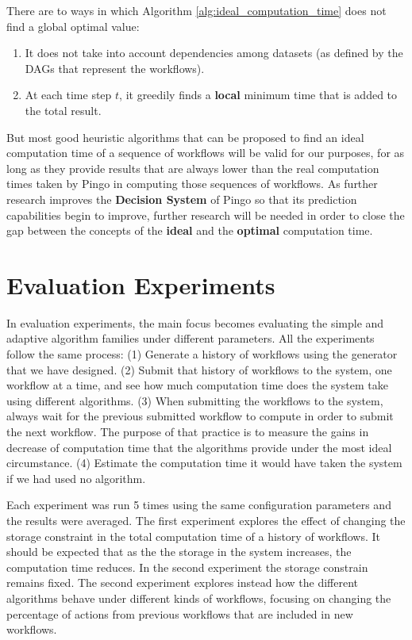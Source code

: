 There are to ways in which Algorithm \ref{alg:ideal_computation_time} does not find a global optimal value:
\begin{enumerate}
\item It does not take into account dependencies among datasets (as defined by the DAGs that represent the workflows).
\item At each time step $t$, it greedily finds a \textbf{local} minimum time that is added to the total result.
\end{enumerate}

But most good heuristic algorithms that can be proposed to find an ideal computation time of a sequence of workflows will be valid for our purposes, for as long as they provide results that are always lower than the real computation times taken by Pingo in computing those sequences of workflows.  As further research improves the \textbf{Decision System} of Pingo so that its prediction capabilities begin to improve, further research will be needed in order to close the gap between the concepts of the \textbf{ideal} and the \textbf{optimal} computation time.

\section{Evaluation Experiments}
In evaluation experiments, the main focus becomes evaluating the simple and adaptive algorithm families under different parameters.  All the experiments follow the same process:  (1) Generate a history of workflows using the generator that we have designed.  (2) Submit that history of workflows to the system, one workflow at a time, and see how much computation time does the system take using different algorithms. (3) When submitting the workflows to the system, always wait for the previous submitted workflow to compute in order to submit the next workflow. The purpose of that practice is to measure the gains in decrease of computation time that the algorithms provide under the most ideal circumstance. (4) Estimate the computation time it would have taken the system if we had used no algorithm.

Each experiment was run 5 times using the same configuration parameters and the results were averaged.  The first experiment explores the effect of changing the storage constraint in the total computation time of a history of workflows.  It should be expected that as the the storage in the system increases, the computation time reduces.  In the second experiment the storage constrain remains fixed.  The second experiment explores instead how the different algorithms behave under different kinds of workflows, focusing on changing the percentage of actions from previous workflows that are included in new workflows.

